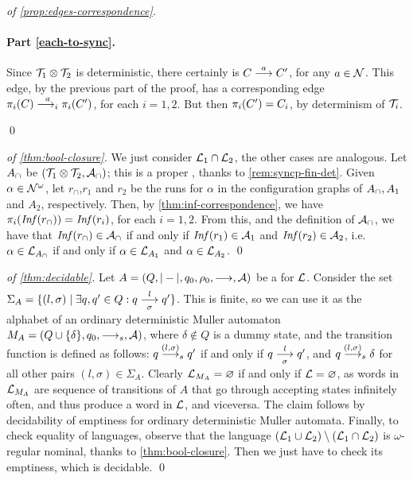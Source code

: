 \begin{proof}[of \cref{prop:edges-correspondence}]
\paragraph{Part \eqref{each-to-sync}.} 
Since $\mathcal{T}_1 \otimes \mathcal{T}_2$ is deterministic, there certainly is $C \overset{a}{\longrightarrow} C'$, for any $a \in \mathcal{N}$. This edge, by the previous part of the proof, has a corresponding edge $\pi_i(C) \overset{a}{\longrightarrow_{i}} \pi_i(C')$, for each $i=1,2$. But then $\pi_i(C') = C_i$, by determinism of $\mathcal{T}_i$.

\qed
\end{proof}

\begin{proof}[of \cref{thm:bool-closure}]
We just consider $\mathcal{L}_1 \cap \mathcal{L}_2$, the other cases are analogous. Let $A_\cap$ be $(\mathcal{T}_1 \otimes \mathcal{T}_2,\mathcal{A}_\cap)$; this is a proper \hdma{}, thanks to \cref{rem:syncp-fin-det}. Given $\alpha \in \mathcal{N}^\omega$, let $r_\cap$,$r_1$ and $r_2$ be the runs for $\alpha$ in the configuration graphs of $A_\cap,A_1$ and $A_2$, respectively. Then, by \cref{thm:inf-correspondence}, we have $\pi_i(\mathit{Inf}(r_\cap)) = \mathit{Inf}(r_i)$, for each $i=1,2$. From this, and the definition of $\mathcal{A}_\cap$, we have that $\mathit{Inf}(r_\cap) \in \mathcal{A}_\cap$ if and only if $\mathit{Inf}(r_1) \in \mathcal{A}_1$ and $\mathit{Inf}(r_2) \in \mathcal{A}_2$, i.e.\ $\alpha \in \mathcal{L}_{A_\cap}$ if and only if $\alpha \in \mathcal{L}_{A_1}$ and $\alpha \in\mathcal{L}_{A_2}$.
\qed
\end{proof}
%
\begin{proof}[of \cref{thm:decidable}]
Let $A = (Q,|-|,q_0,\rho_0,\overset{}{\underset{}{\longrightarrow}},\mathcal{A})$ be a \hdma{} for $\mathcal{L}$. Consider the set $\Sigma_A = \{ (l,\sigma) \mid \exists q,q' \in Q : q \overset{l}{\underset{\sigma}{\longrightarrow}} q' \}$. This is finite, so we can use it as the alphabet of an ordinary deterministic Muller automaton $M_A = (Q \cup \{\delta\}, q_0,\overset{}{\longrightarrow}_s,\mathcal{A})$, where $\delta \notin Q$ is a dummy state, and the transition function is defined as follows: $q \overset{(l,\sigma)}{\longrightarrow}_s q'$ if and only if $q \overset{l}{\underset{\sigma}{\longrightarrow}} q'$, and $q \overset{(l,\sigma)}{\longrightarrow}_s \delta$ for all other pairs $(l,\sigma) \in \Sigma_A$. Clearly $\mathcal{L}_{M_A} = \varnothing$ if and only if $\mathcal{L} = \varnothing$, as words in $\mathcal{L}_{M_A}$ are sequence of transitions of $A$ that go through accepting states infinitely often, and thus produce a word in $\mathcal{L}$, and viceversa. The claim follows by decidability of emptiness for ordinary deterministic Muller automata. Finally, to check equality of languages, observe that the language $(\mathcal{L}_1 \cup \mathcal{L}_2) \setminus (\mathcal{L}_1 \cap \mathcal{L}_2 )$ is $\omega$-regular nominal, thanks to \cref{thm:bool-closure}. Then we just have to check its emptiness, which is decidable.
\qed
\end{proof}
